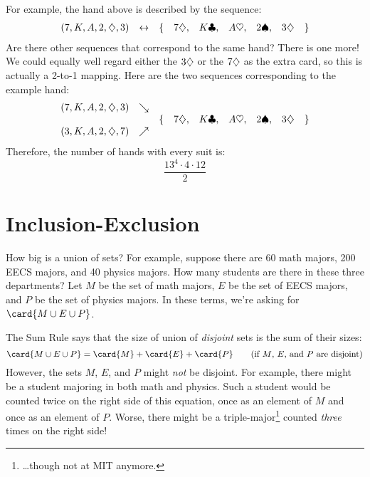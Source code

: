 For example, the hand above is described by the sequence:
%
\[
\begin{array}{rcrcccccl}
(7, K, A, 2, \diamondsuit, 3) & \leftrightarrow &
    \{ & 7 \diamondsuit, & K \clubsuit, & A \heartsuit, & 2 \spadesuit, & 3 \diamondsuit & \}
\end{array}
\]
%
Are there other sequences that correspond to the same hand?  There is
one more!  We could equally well regard either the $3 \diamondsuit$ or the $7
\diamondsuit$ as the extra card, so this is actually a 2-to-1 mapping.  Here
are the two sequences corresponding to the example hand:
%
\[
\begin{array}{rcrcccccl}
(7, K, A, 2, \diamondsuit, 3) & \searrow & \\
 && \{ & 7 \diamondsuit, & K \clubsuit, & A \heartsuit, & 2 \spadesuit, & 3 \diamondsuit & \} \\
(3, K, A, 2, \diamondsuit, 7) & \nearrow &
\end{array}
\]
%
Therefore, the number of hands with every suit is:
%
\[
\frac{13^4 \cdot 4 \cdot 12}{2}
\]

\begin{problems}
\classproblems
{}

\examproblems
{}

\end{problems}



{\section{Inclusion-Exclusion}}\label{inc-ex_sec}

How big is a union of sets?  For example, suppose there are 60 math
majors, 200 EECS majors, and 40 physics majors.  How many students are
there in these three departments?  Let $M$ be the set of math majors,
$E$ be the set of EECS majors, and $P$ be the set of physics majors.  In
these terms, we're asking for $\card{M \cup E \cup P}$.

The Sum Rule says that the size of union of \emph{disjoint} sets is
the sum of their sizes:
%
\[
\card{M \cup E \cup P} = \card{M} + \card{E} + \card{P}
    \qquad \text{(if $M$, $E$, and $P$ are disjoint)}
\]
%
However, the sets $M$, $E$, and $P$ might \emph{not} be disjoint.  For
example, there might be a student majoring in both math and
physics.  Such a student would be counted twice on the right side of this
equation, once as an element of $M$ and once as an element of $P$.  Worse,
there might be a triple-major\footnote{\dots though not at MIT anymore.}
counted \emph{three} times on the right side!

